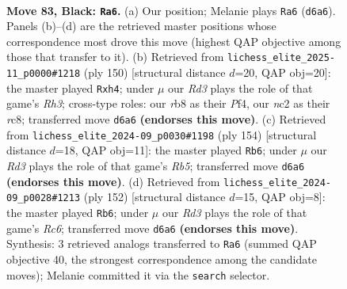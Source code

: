\documentclass[11pt]{article}
\begin{document}
\clearpage

\begin{figure}[p]\centering
\begin{subfigure}{0.46\textwidth}\centering
\resizebox{\linewidth}{!}{%
\newchessgame
\chessboard[
  setfen={1R6/6p1/3r1p2/3P1k1p/7P/5KP1/2N5/8 b - - 6 83},
  showmover=false,
  pgfstyle=straightmove, color=movearrow, markmove={d6-a6}
]}
\caption{}
\end{subfigure}\hfill
\begin{subfigure}{0.46\textwidth}\centering
\resizebox{\linewidth}{!}{%
\newchessgame
\chessboard[
  setfen={2r5/8/5k2/1p1P4/p2K1P1p/2P4R/P7/8 w - - 2 76},
  showmover=false,
  pgfstyle=straightmove, color=movearrow, markmove={h3-h4}
]}
\caption{}
\end{subfigure}
\\[4pt]
\begin{subfigure}{0.46\textwidth}\centering
\resizebox{\linewidth}{!}{%
\newchessgame
\chessboard[
  setfen={8/5pk1/8/1R2PK1p/5P1P/8/1p6/1r6 w - - 55 78},
  showmover=false,
  pgfstyle=straightmove, color=movearrow, markmove={b5-b6}
]}
\caption{}
\end{subfigure}\hfill
\begin{subfigure}{0.46\textwidth}\centering
\resizebox{\linewidth}{!}{%
\newchessgame
\chessboard[
  setfen={6k1/5p2/2R3p1/7p/5P1P/6PK/r7/8 w - - 29 77},
  showmover=false,
  pgfstyle=straightmove, color=movearrow, markmove={c6-b6}
]}
\caption{}
\end{subfigure}
\caption{\textbf{Move 83, Black: \texttt{Ra6}.} (a) Our position; Melanie plays \texttt{Ra6} (\texttt{d6a6}). Panels (b)--(d) are the retrieved master positions whose correspondence most drove this move (highest QAP objective among those that transfer to it). (b) Retrieved from \texttt{lichess\_elite\_2025-11\_p0000\#1218} (ply 150) [structural distance $d$=20, QAP obj=20]: the master played \texttt{Rxh4}; under $\mu$ our \emph{Rd3} plays the role of that game's \emph{Rh3}; cross-type roles: our \emph{r}b8 as their \emph{P}f4, our \emph{n}c2 as their \emph{r}c8; transferred move \texttt{d6a6} \textbf{(endorses this move)}. (c) Retrieved from \texttt{lichess\_elite\_2024-09\_p0030\#1198} (ply 154) [structural distance $d$=18, QAP obj=11]: the master played \texttt{Rb6}; under $\mu$ our \emph{Rd3} plays the role of that game's \emph{Rb5}; transferred move \texttt{d6a6} \textbf{(endorses this move)}. (d) Retrieved from \texttt{lichess\_elite\_2024-09\_p0028\#1213} (ply 152) [structural distance $d$=15, QAP obj=8]: the master played \texttt{Rb6}; under $\mu$ our \emph{Rd3} plays the role of that game's \emph{Rc6}; transferred move \texttt{d6a6} \textbf{(endorses this move)}. Synthesis: 3 retrieved analogs transferred to \texttt{Ra6} (summed QAP objective 40, the strongest correspondence among the candidate moves); Melanie committed it via the \texttt{search} selector.}
\label{fig:thought-m165}
\end{figure}
\end{document}
